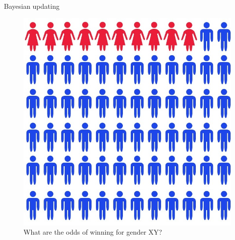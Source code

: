 \begin{frame}{Bayesian updating}

\begin{figure}
\centering
\includegraphics{female_fuel_for_the_digital_economy.jpg}
\caption{What are the odds of winning for gender XY?}
\end{figure}

\end{frame}

